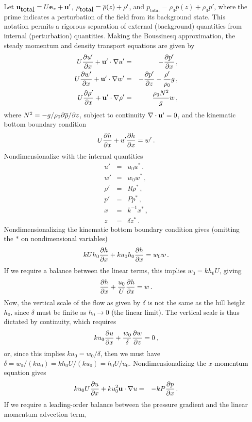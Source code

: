 \documentclass[12pt]{article}
\begin{document}
	Let $\mathbf{u}_{\mbox{total}} = U {\bf e}_x + \mathbf{u}'$, $\rho_{\mbox{total}} = \overline{\rho}(z) + \rho'$, and
	$p_{\mbox{total}} = \rho_0 \overline{p}(z) + \rho_0 p'$, where the prime indicates a perturbation of the field from its background state. This notation permits a rigorous separation of external (background) quantities from internal (perturbation) quantities. 
	Making the Boussinesq approximation, the steady momentum and density transport equations are given by
	\begin{eqnarray*}
	U \frac{\partial{u'}}{\partial{x}} + \mathbf{u}'\cdot\nabla u' &=& -\frac{\partial{p'}}{\partial{x}}\,,\\
	U \frac{\partial{w'}}{\partial{x}} + \mathbf{u}'\cdot\nabla w' &=& -\frac{\partial{p'}}{\partial{z}} - \frac{\rho'}{\rho_0} g\,,\\
	U \frac{\partial{\rho'}}{\partial{x}} + \mathbf{u}'\cdot\nabla\rho' &=& \frac{\rho_0 N^2}{g} w\,,
	\end{eqnarray*}
	where $N^2 = -g/\rho_0 \partial\overline{\rho}/\partial z$, subject to continuity $\nabla\cdot\mathbf{u}'=0$, and
	the kinematic bottom boundary condition
	\[
	U\frac{\partial{h}}{\partial{x}} + u' \frac{\partial{h}}{\partial{x}} = w'\,.
	\]  
	Nondimensionalize with the internal quantities
	\begin{eqnarray*}
		u' &=& u_0 u^*\,,\\
		w' &=& w_0 w^*\,,\\
		\rho' &=& R \rho^*\,,\\
		p' &=& P p^*\,,\\
		x &=& k^{-1} x^*\,,\\
		z &=& \delta z^*\,.
	\end{eqnarray*}
	Nondimensionalizing the kinematic bottom boundary condition gives
	(omitting the $*$ on nondimensional variables)
	\[
	k U h_0 \frac{\partial{h}}{\partial{x}} + k u_0 h_0 \frac{\partial{h}}{\partial{x}} = w_0 w\,.
	\]
	If we require a balance between the linear terms, this implies $w_0 = k h_0 U$, giving
	\[
	\frac{\partial{h}}{\partial{x}} + \frac{u_0}{U} \frac{\partial{h}}{\partial{x}} = w\,.
	\]
	Now, the vertical scale of the flow as given by $\delta$ is not the
	same as the hill height $h_0$, since $\delta$ must be finite as $h_0\to 0$ (the linear limit). The 
	vertical scale is thus dictated by continuity, which requires
	\[
	k u_0 \frac{\partial{u}}{\partial{x}} + \frac{w_0}{\delta} \frac{\partial{w}}{\partial{z}} = 0\,,
	\]
	or, since this implies $k u_0 = w_0/\delta$, then we must have $\delta = w_0/(k u_0) = k h_0 U/(k u_0) = h_0U/u_0$.
	Nondimensionalizing the $x$-momentum equation gives
	\begin{eqnarray*}
	k u_0 U \frac{\partial{u}}{\partial{x}} + k u_0^2\mathbf{u}\cdot\nabla u  &=& -k P \frac{\partial{p}}{\partial{x}}\,.
	\end{eqnarray*}
	If we require a leading-order balance between the pressure gradient and the linear momentum advection term,
\end{document}
